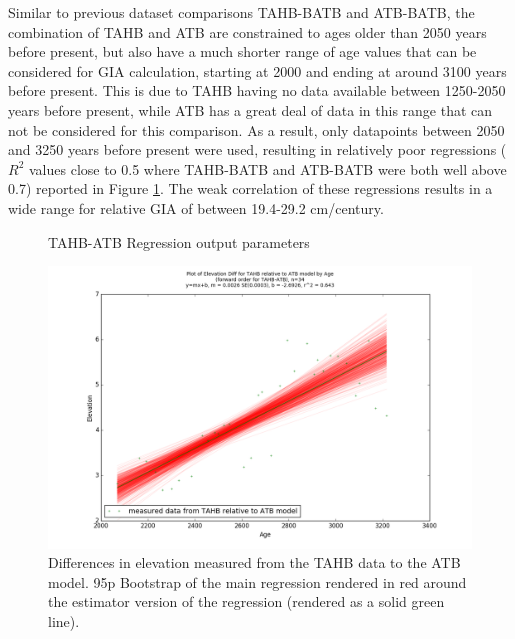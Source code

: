 Similar to previous dataset comparisons TAHB-BATB and ATB-BATB, the combination of TAHB and ATB are constrained to
ages older than
2050 years before present, but also have a much shorter range
of age values that
can be considered for GIA calculation, starting at 2000 and ending at around 3100 years before present.
This is due to TAHB having no data available between 1250-2050 years before present, while ATB
has a great deal of data in this range that can not be considered for this
comparison. As a result, only datapoints between 2050 and 3250 years before present
were used, resulting in
relatively poor regressions ($R^2$ values close to 0.5 where TAHB-BATB and ATB-BATB
were both well above 0.7) reported in Figure \ref{fig:TAHBxATB_regression}.
The weak correlation of these regressions results in a wide range for
relative GIA of between 19.4-29.2 cm/century. \\


\begin{figure}[H]
	\begin{flushleft}
	\end{flushleft}
	\caption{TAHB-ATB Regression output parameters}
	\label{fig:TAHBxATB_regression}
\end{figure}


\newpage

\begin{figure}[H]
	\includegraphics[width=1.7\linewidth, angle=270 ]{data/bothNonZero/withinSeventyFivePercent/gias/theGIA_TAHB_relative_to_ATB.png}
	\caption{Differences in elevation measured from the TAHB data to the ATB model. 95p Bootstrap of the main regression rendered in red around the estimator version of the regression (rendered as a solid green line).}
	\label{fig:gias_TAHBxATB}
\end{figure}
\newpage


